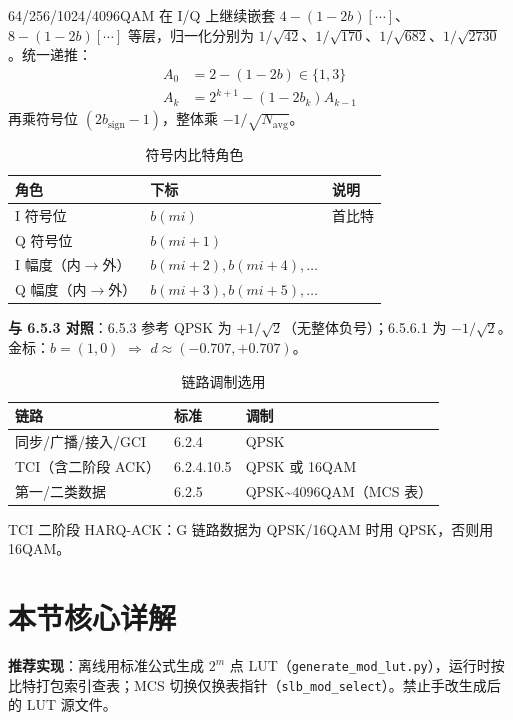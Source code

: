 \documentclass[11pt,a4paper]{ctexart}
\begin{document}
64/256/1024/4096QAM 在 I/Q 上继续嵌套 $4-(1-2b)[\cdots]$、$8-(1-2b)[\cdots]$ 等层，归一化分别为 $1/\sqrt{42}$、$1/\sqrt{170}$、$1/\sqrt{682}$、$1/\sqrt{2730}$。统一递推：
\begin{align}
A_0 &= 2-(1-2b)\in\{1,3\}\\
A_k &= 2^{k+1}-(1-2b_k)A_{k-1}
\end{align}
再乘符号位 $(2b_{\mathrm{sign}}-1)$，整体乘 $-1/\sqrt{N_{\mathrm{avg}}}$。

\begin{longtable}{L{3cm}L{2.5cm}L{8.5cm}}
\caption{符号内比特角色\label{tab:656-bits}} \\
\toprule
\textbf{角色} & \textbf{下标} & \textbf{说明} \\
\midrule
I 符号位 & $b(mi)$ & 首比特 \\
Q 符号位 & $b(mi+1)$ & \\
I 幅度（内$\rightarrow$外） & $b(mi+2),b(mi+4),\ldots$ & \\
Q 幅度（内$\rightarrow$外） & $b(mi+3),b(mi+5),\ldots$ & \\
\bottomrule
\end{longtable}

\textbf{与 6.5.3 对照}：6.5.3 参考 QPSK 为 $+1/\sqrt{2}$（无整体负号）；6.5.6.1 为 $-1/\sqrt{2}$。金标：$b{=}(1,0)$ $\Rightarrow$ $d\approx(-0.707,+0.707)$。

\begin{longtable}{L{4.2cm}L{3cm}L{6.5cm}}
\caption{链路调制选用\label{tab:656-link}} \\
\toprule
\textbf{链路} & \textbf{标准} & \textbf{调制} \\
\midrule
同步/广播/接入/GCI & 6.2.4 & QPSK \\
TCI（含二阶段 ACK） & 6.2.4.10.5 & QPSK 或 16QAM \\
第一/二类数据 & 6.2.5 & QPSK\textasciitilde 4096QAM（MCS 表） \\
\bottomrule
\end{longtable}

TCI 二阶段 HARQ-ACK：G 链路数据为 QPSK/16QAM 时用 QPSK，否则用 16QAM。

\section{本节核心详解}

\textbf{推荐实现}：离线用标准公式生成 $2^m$ 点 LUT（\texttt{generate\_mod\_lut.py}），运行时按比特打包索引查表；MCS 切换仅换表指针（\texttt{slb\_mod\_select}）。禁止手改生成后的 LUT 源文件。
\end{document}
